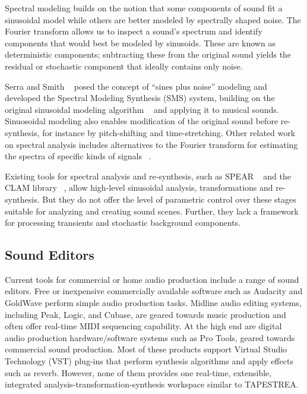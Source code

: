 \documentclass[review]{acmsiggraph}      %
\begin{document}
Spectral modeling builds on the notion that some components of sound fit a sinusoidal model 
while others are better modeled by spectrally shaped noise. 
The Fourier transform allows us to inspect a sound's spectrum and identify components that 
would best be modeled by sinusoids. These are known as deterministic components; 
subtracting these from the original sound yields the residual or stochastic component that 
ideally contains only noise. 

Serra and Smith ~ posed the concept of ``sines plus noise'' 
modeling and developed the Spectral Modeling Synthesis (SMS) system, building on the 
original sinusoidal modeling algorithm ~\cite{McAulay86} and applying it to musical sounds. 
Sinuosoidal modeling also enables modification of the original sound before re-synthesis, for 
instance by pitch-shifting and time-stretching.
Other related work on spectral analysis includes alternatives to 
the Fourier transform for estimating the spectra of specific kinds of 
signals ~\cite{Qi02,Thornburg03}. 

Existing tools for spectral analysis and re-synthesis, such as SPEAR ~\cite{Klingbeil05}
and the CLAM library ~\cite{Amatriain05}, allow high-level sinusoidal analysis, 
transformations and re-synthesis. But they do not offer the level of parametric control over 
these stages suitable for analyzing and creating sound scenes. Further, they lack a 
framework for processing transients and stochastic background components.

\subsection{Sound Editors}

Current tools for commercial or home audio production include a range of sound editors. Free 
or inexpensive commercially available software such as Audacity and GoldWave perform simple 
audio production tasks. Midline audio editing systems, including Peak, Logic, and Cubase, are 
geared towards music production and often offer real-time MIDI sequencing capability. At the 
high end are digital audio production hardware/software systems such as Pro Tools, geared 
towards commercial sound production. Most of these products support Virtual Studio Technology 
(VST) plug-ins that perform synthesis algorithms and apply effects such as reverb. However, none of them provides one real-time, extensible, integrated analysis-transformation-synthesis workspace similar to TAPESTREA.  
\end{document}
